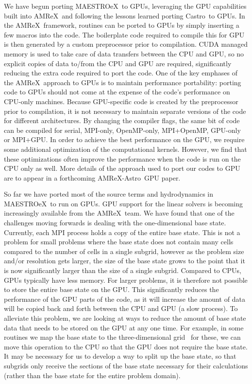 \documentclass[a4paper]{jpconf}
\newcommand{\maestroex}{{\sffamily MAESTROeX}}
\newcommand{\castro}{{\sffamily Castro}}
\newcommand{\amrex}{{\sffamily AMReX}}
\newcommand{\amrexastro}{{\sffamily AMReX-Astro}}
\begin{document}
We have begun porting \maestroex~to GPUs, leveraging the GPU capabilities built into \amrex~and following the lessons learned porting \castro~to GPUs. In the \amrex~framework, routines can be ported to GPUs by simply inserting a few macros into the code. The boilerplate code required to compile this for GPU is then generated by a custom preprocessor prior to compilation. CUDA managed memory is used to take care of data transfers between the CPU and GPU, so no explicit copies of data to/from the CPU and GPU are required, significantly reducing the extra code required to port the code. One of the key emphases of the \amrex~approach to GPUs is to maintain performance portability: porting code to GPUs should not come at the expense of the code's performance on CPU-only machines. Because GPU-specific code is created by the preprocessor prior to compilation, it is not necessary to maintain separate versions of the code for different architectures. By changing the compiler flags, the same bit of code can be compiled for serial, MPI-only, OpenMP-only, MPI+OpenMP, GPU-only or MPI+GPU.
In order to achieve the best performance on the GPU, we require some additional optimization of the computational kernels. However, we find that these optimizations often improve the performance when the code is run on the CPU only as well. 
More details of the approach used to port our codes to GPU are to appear in a forthcoming \amrexastro~GPU paper. 

So far we have ported most of the source terms and hydrodynamics in \maestroex~to run on GPUs. GPU support for the linear solvers is becoming increasingly available from the \amrex~team.  We have found that one of the challenges moving forwards is dealing with the one-dimensional base state. Currently, each MPI process holds a copy of the entire base state. This is not a problem for small problems where the base state does not contain many cells compared to the number of cells in a single subgrid, however as the problem size and/or resolution gets larger, the size of the base state grows to the point that it is now significantly larger than the size of a single subgrid. Compared to CPUs, GPUs typically have less memory. For larger problems, it is therefore not possible to store the entire base state on the GPU. This significantly reduces the performance of the GPU parts of the code, as it will increase the amount of data will be copied back and forth between the CPU and GPU (a slow process). To alleviate this problem, we are looking at ways to reduce the amount of base state data that needs to be stored on the GPU at any one time. For example, in some routines we map the base state to the three-dimensional grid \textendash~for these, we can move this operation to the CPU so that the GPU does not require the base state. It may be necessary for us to develop a way to split up the base state, so that subgrids only receive the sections of the base state necessary for their calculations (rather than the base state for the entire problem domain). 
\end{document}
